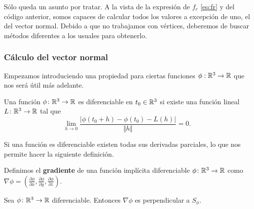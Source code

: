 Sólo queda un asunto por tratar. A la vista de la expresión de $f_r$ \eqref{eq:fr} y del código anterior, somos capaces de calcular todos los valores a excepción de uno, el del vector normal. Debido a que no trabajamos con vértices, deberemos de buscar métodos diferentes a los usuales para obtenerlo.

\subsubsection{Cálculo del vector normal}
Empezamos introduciendo una propiedad para ciertas funciones $\phi:\mathbb{R}^3\to\mathbb{R}$ que nos será útil más adelante. 

\begin{definicion}
    Una función $\phi\colon \mathbb{R}^3 \to \mathbb{R}$ es diferenciable en $t_0 \in \mathbb{R}^3$ si existe una función lineal $L\colon \mathbb{R}^3\to \mathbb{R}$ tal que
    \begin{equation*}
        \lim_{h\to 0}\frac{\vert \phi(t_0+h)-\phi(t_0) - L(h)\vert}{\Vert h\Vert} = 0.
    \end{equation*}
\end{definicion}

Si una función es diferenciable existen todas sus derivadas parciales, lo que nos permite hacer la siguiente definición.
\begin{definicion}
  Definimos el \textbf{gradiente} de una función implícita diferenciable $\phi\colon \mathbb{R}^3\to\mathbb{R}$ como $\nabla\phi = \left(\frac{\partial \phi}{\partial x}, \frac{\partial \phi}{\partial y}, \frac{\partial \phi}{\partial z}\right)$.
\end{definicion}

\begin{proposicion}\label{p:gradient_perp}
  Sea $\phi\colon \mathbb{R}^3\to \mathbb{R}$ diferenciable. Entonces $\nabla\phi$ es perpendicular a $S_\phi$.
\end{proposicion}

